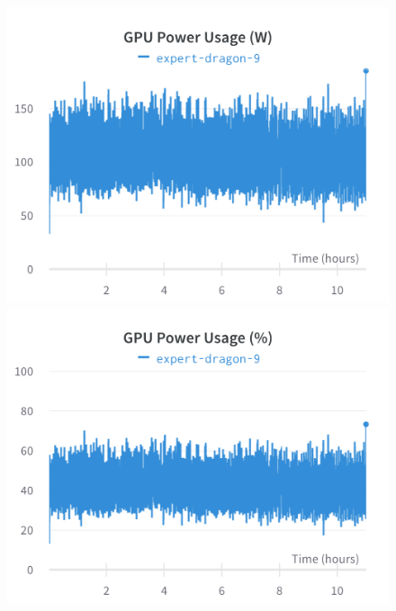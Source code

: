 \documentclass{article}
\begin{document}
\begin{figure}[!htb]
\includegraphics[width=\linewidth]{charts/Section-6-Panel-4-tediaa71w}
\caption{}
\endminipage\hfill
{}
\includegraphics[width=\linewidth]{charts/Section-6-Panel-5-ydqcijooe}
\caption{}
\endminipage
\end{figure}

\nocite{*}


\end{document}
